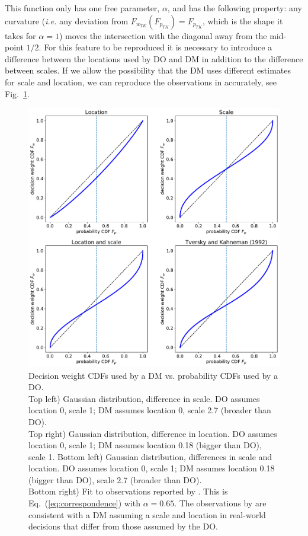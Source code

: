 \documentclass[11pt]{article}
\newcommand{\eref}[1]{Eq.~(\ref{eq:#1})}
\newcommand{\ie}{{\it i.e.}\xspace}
\newcommand{\flabel}[1]{\label{fig:#1}}
\newcommand{\fref}[1]{Fig.~\ref{fig:#1}}
\numberwithin{equation}{section}
\begin{document}
This function 
only has one free parameter, $\alpha$, and has the following property: any curvature (\ie any deviation from $F_{w_{TK}}(F_{p_{TK}})=F_{p_{TK}}$, which is the shape it takes for $\alpha=1$) moves the intersection with the diagonal away from the mid-point $1/2$. For this feature to be reproduced it is necessary to introduce a difference between the locations used by DO and DM in addition to the difference between scales. If we allow the possibility that the DM uses different estimates for scale and location, we can reproduce the observations in \citep{TverskyKahneman1992} accurately, see \fref{CDF_weights}.

\begin{figure}
\centering
\includegraphics[width=1.0\textwidth]{./figs/Gauss_scale_location_both_KT.pdf}
\caption{Decision weight CDFs used by a DM vs. probability CDFs used by a DO.\\ 
Top left) Gaussian distribution, difference in scale. DO assumes location 0, scale 1; DM assumes location 0, scale 2.7 (broader than DO).\\ 
Top right) Gaussian distribution, difference in location. DO assumes location 0, scale 1; DM assumes location 0.18 (bigger than DO), scale 1.
Bottom left) Gaussian distribution, differences in scale and location. DO assumes location 0, scale 1; DM assumes location 0.18 (bigger than DO), scale 2.7 (broader than DO).\\ 
Bottom right) Fit to observations reported by \citet{TverskyKahneman1992}. This is \eref{correspondence} with $\alpha=0.65$.
The observations by \citet{TverskyKahneman1992} are consistent with a DM assuming a scale and location in real-world decisions that differ from those assumed by the DO.}
\flabel{CDF_weights}
\end{figure}
\end{document}
